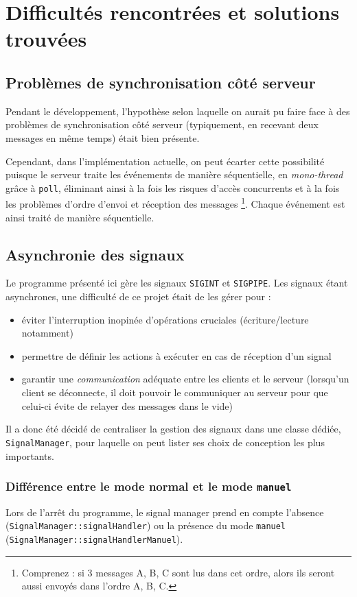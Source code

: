 \documentclass{article}
\begin{document}
\section{Difficultés rencontrées et solutions trouvées}
\subsection{Problèmes de synchronisation côté serveur}
Pendant le développement, l'hypothèse selon laquelle on aurait pu faire face à des problèmes de synchronisation côté serveur (typiquement, en recevant deux messages en même temps) était bien présente.

Cependant, dans l'implémentation actuelle, on peut écarter cette possibilité puisque le serveur traite les événements de manière séquentielle, en \textit{mono-thread} grâce à \texttt{poll}, éliminant ainsi à la fois les risques d'accès concurrents et à la fois les problèmes d'ordre d'envoi et réception des messages \footnote{Comprenez : si 3 messages A, B, C sont lus dans cet ordre, alors ils seront aussi envoyés dans l'ordre A, B, C.}. Chaque événement est ainsi traité de manière séquentielle.

\subsection{Asynchronie des signaux}
Le programme présenté ici gère les signaux \texttt{SIGINT} et \texttt{SIGPIPE}. Les signaux étant asynchrones, une difficulté de ce projet était de les gérer pour :
\begin{itemize}
    \item éviter l'interruption inopinée d'opérations cruciales (écriture/lecture notamment)
    \item permettre de définir les actions à exécuter en cas de réception d'un signal
    \item garantir une \textit{communication} adéquate entre les clients et le serveur (lorsqu'un client se déconnecte, il doit pouvoir le communiquer au serveur pour que celui-ci évite de relayer des messages dans le vide)
\end{itemize}

Il a donc été décidé de centraliser la gestion des signaux dans une classe dédiée, \texttt{SignalManager}, pour laquelle on peut lister ses choix de conception les plus importants.



\subsubsection{Différence entre le mode normal et le mode \texttt{manuel}}
Lors de l'arrêt du programme, le signal manager prend en compte l'absence (\texttt{SignalManager::signalHandler}) ou la présence du mode \texttt{manuel} (\texttt{SignalManager::signalHandlerManuel}).
\end{document}
